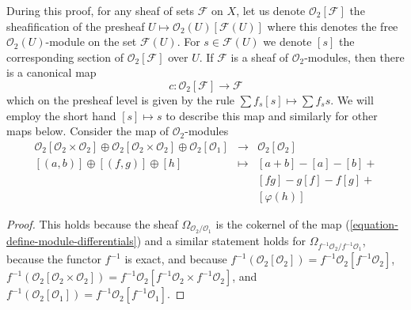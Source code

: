 \documentclass[10pt,a4paper]{amsart}
\theoremstyle{plain}
\theoremstyle{definition}
\theoremstyle{remark}
\numberwithin{equation}{subsection}
\begin{document}
During this proof, for any sheaf of sets $\mathcal{F}$ on $X$,
let us denote $\mathcal{O}_2[\mathcal{F}]$ the sheafification of the
presheaf $U \mapsto \mathcal{O}_2(U)[\mathcal{F}(U)]$ where this denotes
the free $\mathcal{O}_2(U)$-module on the set $\mathcal{F}(U)$.
For $s \in \mathcal{F}(U)$ we denote $[s]$ the corresponding section
of $\mathcal{O}_2[\mathcal{F}]$ over $U$. If $\mathcal{F}$ is a sheaf of
$\mathcal{O}_2$-modules, then there is a canonical map
$$
c : \mathcal{O}_2[\mathcal{F}] \longrightarrow \mathcal{F}
$$
which on the presheaf level is given by the rule
$\sum f_s[s] \mapsto \sum f_s s$. We will employ the short hand
$[s] \mapsto s$ to
describe this map and similarly for other maps below. Consider
the map of $\mathcal{O}_2$-modules
\begin{equation}
\label{equation-define-module-differentials}
\begin{matrix}
\mathcal{O}_2[\mathcal{O}_2 \times \mathcal{O}_2] \oplus
\mathcal{O}_2[\mathcal{O}_2 \times \mathcal{O}_2] \oplus
\mathcal{O}_2[\mathcal{O}_1] &
\longrightarrow &
\mathcal{O}_2[\mathcal{O}_2] \\
[(a, b)] \oplus [(f, g)] \oplus [h] & \longmapsto & [a + b] - [a] - [b] + \\
& & [fg] - g[f] - f[g] + \\
& & [\varphi(h)]
\end{matrix}
\end{equation}

\begin{proof}
This holds because the sheaf $\Omega_{\mathcal{O}_2/\mathcal{O}_1}$
is the cokernel of the map (\ref{equation-define-module-differentials})
and a similar statement holds for
$\Omega_{f^{-1}\mathcal{O}_2/f^{-1}\mathcal{O}_1}$,
because the functor $f^{-1}$ is exact, and because
$f^{-1}(\mathcal{O}_2[\mathcal{O}_2]) =
f^{-1}\mathcal{O}_2[f^{-1}\mathcal{O}_2]$,
$f^{-1}(\mathcal{O}_2[\mathcal{O}_2 \times \mathcal{O}_2]) =
f^{-1}\mathcal{O}_2[f^{-1}\mathcal{O}_2 \times f^{-1}\mathcal{O}_2]$, and
$f^{-1}(\mathcal{O}_2[\mathcal{O}_1]) =
f^{-1}\mathcal{O}_2[f^{-1}\mathcal{O}_1]$.
\end{proof}
\end{document}
